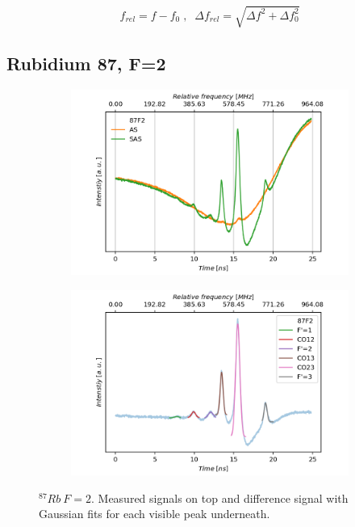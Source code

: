 \documentclass[]{article}
\begin{document}
\begin{equation}
f_{rel} = f - f_0 \;,\;\; \Delta f_{rel} = \sqrt{ \Delta f^2 + \Delta f_0^2}
\label{eq:rel freq}
\end{equation}


\newpage
\subsection{Rubidium 87, F=2}
\begin{figure}[H]
\centering
\begin{subfigure}{.7\textwidth}
\includegraphics[width=\linewidth]{Plots/87F2_Both.png}
\end{subfigure}

\begin{subfigure}[c]{.7\textwidth}
\includegraphics[width=\linewidth]{Plots/87F2_Diff.png}
\end{subfigure}
\caption{$^{87}Rb\ F=2 $. Measured signals on top and difference signal with Gaussian fits for each visible peak underneath.}
\label{fig: 87F2}
\end{figure}
\end{document}
